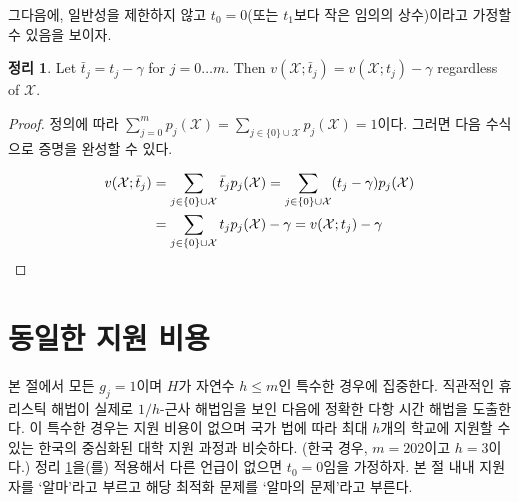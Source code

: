 \documentclass[11pt]{article} %
\newif\ifen
\newtheorem{theorem}{Theorem}
\theoremstyle{definition}
\newtheorem{theorem}{정리}
\theoremstyle{definition}
\begin{document}
\ifen
Next, we show that without loss of generality, we may assume that $t_0 = 0$ (or any constant less than $t_1$).
\else
그다음에, 일반성을 제한하지 않고 $t_0 = 0$(또는 $t_1$보다 작은 임의의 상수)이라고 가정할 수 있음을 보이자.
\fi
\begin{theorem} \label{assumetzerozero}
Let $\bar t_j = t_j - \gamma$ for $j = 0 \dots m$. Then $v(\mathcal{X}; \bar t_j) = v(\mathcal{X};  t_j) -  \gamma$ regardless of $\mathcal{X}$. 
\end{theorem}
\begin{proof}
\ifen
By definition, $\sum_{j=0}^m p_j(\mathcal{X}) = \sum_{j \in \{0\}\cup\mathcal{X}} p_j(\mathcal{X}) = 1$. Therefore
\else
정의에 따라 $\sum_{j=0}^m p_j(\mathcal{X}) = \sum_{j \in \{0\}\cup\mathcal{X}} p_j(\mathcal{X}) = 1$이다. 그러면 다음 수식으로 증명을 완성할 수 있다.
\fi
\begin{align}
\begin{split}
v(\mathcal{X}; \bar t_j) &= \sum_{j\in \{0\}\cup\mathcal{X}}  \bar t_j p_j(\mathcal{X})
=\sum_{j\in \{0\}\cup\mathcal{X}} (t_j - \gamma) p_j(\mathcal{X}) \\
&=\sum_{j\in \{0\}\cup\mathcal{X}} t_j p_j(\mathcal{X})  - \gamma 
= v(\mathcal{X}; t_j) - \gamma
\end{split} \ifen\else\qedhere\fi
\end{align}
\ifen which completes the proof.\fi
\end{proof}




\ifen \section{Homogeneous application costs}  \else \section{동일한 지원 비용} \fi \label{homogappcosts}
\ifen In this section, we focus on the special case in which each $g_j = 1$ and $H$ is a natural number $h \leq m$.   We show that an intuitive heuristic is in fact a $1/h$-approximation algorithm, then derive an exact polynomial-time solution algorithm.
This case is similar to the centralized college admissions process in Korea, where there is no application fee, but by law, students are allowed to apply to no more than $h$ schools. (In the Korean case, $m=202$ and $h=3$.) Applying Theorem \ref{assumetzerozero}, we assume that $t_0 = 0$ unless otherwise noted. Throughout this section, we will call the applicant Alma, and refer to the corresponding optimization problem as Alma's problem. 
\else
본 절에서 모든 $g_j = 1$이며 $H$가 자연수 $h \leq m$인 특수한 경우에 집중한다. 직관적인 휴리스틱 해법이 실제로 $1/h$-근사 해법임을 보인 다음에 정확한 다항 시간 해법을 도출한다. 이 특수한 경우는 지원 비용이 없으며 국가 법에 따라 최대 $h$개의 학교에 지원할 수 있는 한국의 중심화된 대학 지원 과정과 비슷하다. (한국 경우,  $m=202$이고 $h=3$이다.) 정리 \ref{assumetzerozero}을(를) 적용해서 다른 언급이 없으면 $t_0 = 0$임을 가정하자. 본 절 내내 지원자를 `알마'라고 부르고 해당 최적화 문제를 `알마의 문제'라고 부른다.
\fi
\end{document}
